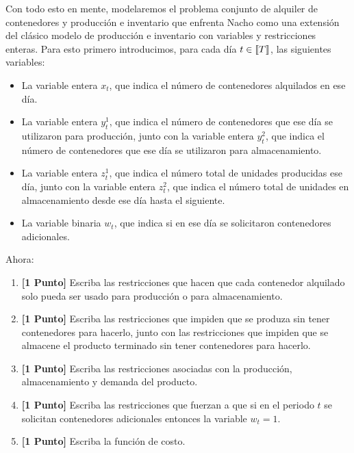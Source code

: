 \documentclass[ a4paper, twoside, 11pt]{article}
\begin{document}
\begin{problem}
Con todo esto en mente, modelaremos el problema conjunto de alquiler de contenedores y producci\'on e inventario que enfrenta Nacho como una extensi\'on del cl\'asico modelo de producci\'on e inventario con variables y restricciones enteras. Para esto primero introducimos, para cada d\'ia $t \in \llbracket T \rrbracket$, las siguientes variables: 
\begin{itemize}
\item La variable entera $x_t$, que indica el n\'umero de contenedores alquilados en ese d\'ia. 
\item La variable entera $y_t^1$, que indica el n\'umero de contenedores que ese d\'ia se utilizaron para producci\'on, junto con la variable entera $y_t^2$, que indica el n\'umero de contenedores que ese d\'ia se utilizaron para almacenamiento. 
\item La variable entera $z_t^1$, que indica el n\'umero total de unidades producidas ese d\'ia, junto con la variable entera $z_t^2$, que indica el n\'umero total de unidades en almacenamiento desde ese d\'ia hasta el siguiente. 
\item La variable binaria $w_t$, que indica si en ese d\'ia se solicitaron contenedores adicionales. 
\end{itemize}

Ahora: 
\begin{enumerate}[label=\textbf{\alph*)}]
\item \textbf{[1 Punto]} Escriba las restricciones que hacen que cada contenedor alquilado solo pueda ser usado para producci\'on o para almacenamiento. 
\item \textbf{[1 Punto]} Escriba las restricciones que impiden que se produza sin tener contenedores para hacerlo, junto con las restricciones que impiden que se almacene el producto terminado sin tener contenedores para hacerlo. 
\item \textbf{[1 Punto]} Escriba las restricciones asociadas con la producci\'on, almacenamiento y demanda del producto. 
\item \textbf{[1 Punto]} Escriba las restricciones que fuerzan a que si en el periodo $t$ se solicitan contenedores adicionales entonces la variable $w_t = 1$. 
\item \textbf{[1 Punto]} Escriba la funci\'on de costo. 
\end{enumerate}

\end{problem}
\fullskip
\end{document}
